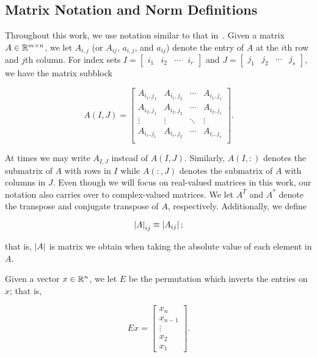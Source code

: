 \subsection{Matrix Notation and Norm Definitions}

Throughout this work, we use notation similar to that in~\cite{gvl4}.
Given a matrix $A\in\mathbb{R}^{m\times n}$,
we let $A_{i,j}$ (or $A_{ij}$, $a_{i,j}$, and $a_{ij}$) denote the entry
of $A$ at the $i$th row and $j$th column.
For index sets
$I = \begin{bmatrix} i_{1} & i_{2} & \cdots & i_{r}\end{bmatrix}$ and
$J = \begin{bmatrix} j_{1} & j_{2} & \cdots & j_{s}\end{bmatrix}$,
we have the matrix subblock

\begin{equation}
    A(I,J) = \begin{bmatrix}
        A_{i_{1},j_{1}} & A_{i_{1},j_{2}} & \cdots & A_{i_{1},j_{s}} \\
        A_{i_{2},j_{1}} & A_{i_{2},j_{2}} & \cdots & A_{i_{2},j_{s}} \\
            \vdots      &     \vdots      & \ddots &     \vdots      \\
        A_{i_{r},j_{1}} & A_{i_{r},j_{2}} & \cdots & A_{i_{r},j_{s}} \\
    \end{bmatrix}.
\end{equation}

\noindent
At times we may write $A_{I,J}$ instead of $A(I,J)$.
Similarly, $A(I,:)$ denotes the submatrix of $A$ with rows in $I$
while $A(:,J)$ denotes the submatrix of $A$ with columns in $J$.
Even though we will focus on real-valued matrices in this work,
our notation also carries over to complex-valued matrices.
We let $A^{T}$ and $A^{*}$ denote the transpose and conjugate transpose
of $A$, respectively.
Additionally, we define

\begin{equation}
    \left| A \right|_{ij} \equiv \left| A_{ij} \right|;
\end{equation}

\noindent
that is, $\left| A \right|$ is matrix we obtain when taking the absolute value of
each element in $A$.

Given a vector $x\in\mathbb{R}^{n}$, we let $E$ be the
permutation which inverts the entries on $x$; that is,

\begin{equation}
    Ex = \begin{bmatrix} x_{n} \\ x_{n-1} \\ \vdots \\ x_{2} \\ x_{1}
        \end{bmatrix}.
\end{equation}

